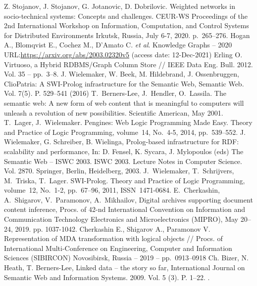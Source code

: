 \documentclass[
]{ceurart}
\begin{document}
\begin{thebibliography}{99}
 Z. Stojanov, J. Stojanov, G. Jotanovic, D. Dobrilovic. Weighted networks in socio-technical systems: Concepts and challenges. CEUR-WS Proceedings of the 2nd International Workshop on Information, Computation, and Control Systems for Distributed Environments Irkutsk, Russia, July 6-7, 2020. p.~265--276.
 Hogan A., Blomqvist E., Cochez M., D’Amato C. \emph{et al}. Knowledge Graphs -- 2020 URL:\url{https://arxiv.org/abs/2003.02320v5} (access date: 12-Dec-2021)
 Erling O. Virtuoso, a Hybrid RDBMS/Graph Column Store // IEEE Data Eng. Bull. 2012. Vol. 35 -- pp.~3--8.
  J. Wielemaker, W. Beek, M. Hildebrand, J. Ossenbruggen, ClioPatria: A
  SWI-Prolog infrastructure for the Semantic Web, Semantic Web.
  Vol. 7(5). P. 529--541 (2016) 
 T.~Berners-Lee, J.~Hendler, O.~Lassila.  The semantic web: A new form of web content that is meaningful to computers will unleash a revolution of new possibilities.  Scientific American, May 2001.
 T.~Lager, J.~Wielemaker. Pengines: Web Logic Programming Made Easy.  Theory and Practice of Logic Programming, volume~14, No.~4-5, 2014, pp.~539--552. 
  J. Wielemaker, G. Schreiber, B. Wielinga, Prolog-based infrastructure
  for RDF: scalability and performance, In: D. Fensel, K. Sycara,
  J. Mylopoulos (eds) The Semantic Web -- ISWC 2003. ISWC 2003. Lecture
  Notes in Computer Science. Vol. 2870. Springer, Berlin,
  Heidelberg, 2003.
 J.~Wielemaker, T.~Schrijvers, M.~Triska, T.~Lager. SWI-Prolog. Theory and Practice of Logic Programming, volume~12, No.~1-2, pp.~67--96, 2011, ISSN~1471-0684.
 E.~Cherkashin, A.~Shigarov, V.~Paramonov, A.~Mikhailov, Digital archives supporting document content inference, Procs.  of 42-nd International Convention on Information and Communication Technology Electronics and Microelectronics (MIPRO), May 20–24, 2019.  pp. 1037-1042. 
 Cherkashin E., Shigarov A., Paramonov V. Representation of MDA transformation with logical objects // Procs. of International Multi-Conference on Engineering, Computer and Information Sciences (SIBIRCON) Novosibirsk, Russia -- 2019 -- pp.~0913--0918 
 Ch. Bizer, N. Heath, T. Berners-Lee, Linked data -- the story so
  far, International Journal on Semantic Web and Information Systems.
  2009. Vol. 5 (3). P. 1--22. .

\end{thebibliography}
\end{document}
